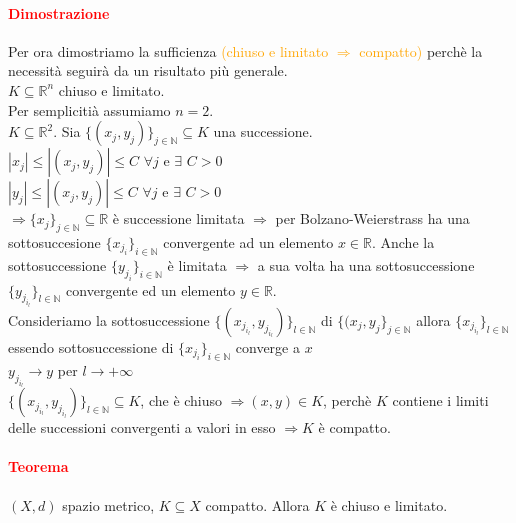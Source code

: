 \documentclass{article}
\newcommand{\R}{\mathbb{R}}
\newcommand{\N}{\mathbb{N}}
\begin{document}
\paragraph{\textcolor{red}{Dimostrazione}}
Per ora dimostriamo la sufficienza \textcolor{orange}{(chiuso e limitato $\Rightarrow$ compatto)} perchè la necessità seguirà da un risultato più generale.\\
$K \subseteq \R^n$ chiuso e limitato.\\
Per semplicitià assumiamo $n=2$.\\
$K \subseteq \R^2$. Sia $\{(x_j,y_j)\}_{j \in \N} \subseteq K$ una successione.\\
$|x_j|\leq |(x_j,y_j)|\leq C \,\, \forall j$ e $ \exists\,\, C >0$\\
$|y_j|\leq |(x_j,y_j)|\leq C \,\, \forall j$ e $ \exists\,\, C >0$\\
$\Rightarrow \{x_j\}_{j\in\N} \subseteq \R$ è successione limitata $\Rightarrow$ per Bolzano-Weierstrass ha una sottosuccesione $\{x_{j_i}\}_{i\in\N}$ convergente ad un elemento $x \in \R$. Anche la sottosuccessione $\{y_{j_i}\}_{i\in\N}$ è limitata $\Rightarrow$ a sua volta ha una sottosuccessione $\{y_{j_{i_l}}\}_{l\in\N}$ convergente ed un elemento $y \in \R$.\\ Consideriamo la sottosuccessione $\{(x_{j_{i_l}},y_{j_{i_l}})\}_{l \in \N}$ di $\{(x_j,y_j\}_{j\in\N}$ allora $\{x_{j_{i_l}}\}_{l \in \N}$ essendo sottosuccessione di $\{x_{j_i}\}_{i\in\N}$ converge a $x$\\
$y_{j_{i_l}}\rightarrow y$ per $l\rightarrow+\infty$\\
$\{(x_{j_{i_l}},y_{j_{i_l}})\}_{l\in \N} \subseteq K$, che è chiuso $\Rightarrow (x,y)\in K$, perchè $K$ contiene i limiti delle successioni convergenti a valori in esso $\Rightarrow K$ è compatto.
\begin{flushright}
\large\Lightning
\end{flushright}

\paragraph{\textcolor{red}{Teorema}}
$(X,d)$ spazio metrico, $K \subseteq X$ compatto. Allora $K$ è chiuso e limitato.
\end{document}

